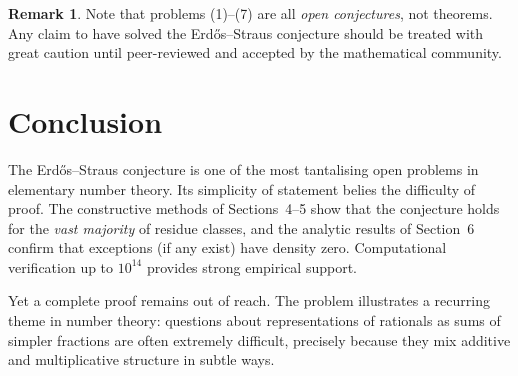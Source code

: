 \documentclass[12pt,a4paper]{amsart}
\theoremstyle{definition}
\newtheorem{remark}[theorem]{Remark}
\begin{document}
\begin{remark}
Note that problems (1)--(7) are all \emph{open conjectures}, not theorems.
Any claim to have solved the Erd\H{o}s--Straus conjecture should be
treated with great caution until peer-reviewed and accepted by the
mathematical community.
\end{remark}

\section*{Conclusion}

The Erd\H{o}s--Straus conjecture is one of the most tantalising open problems
in elementary number theory.  Its simplicity of statement belies the
difficulty of proof.  The constructive methods of Sections~4--5 show that
the conjecture holds for the \emph{vast majority} of residue classes, and
the analytic results of Section~6 confirm that exceptions (if any exist)
have density zero.  Computational verification up to $10^{14}$ provides
strong empirical support.

Yet a complete proof remains out of reach.  The problem illustrates a
recurring theme in number theory: questions about representations of
rationals as sums of simpler fractions are often extremely difficult,
precisely because they mix additive and multiplicative structure in subtle ways.
\end{document}
